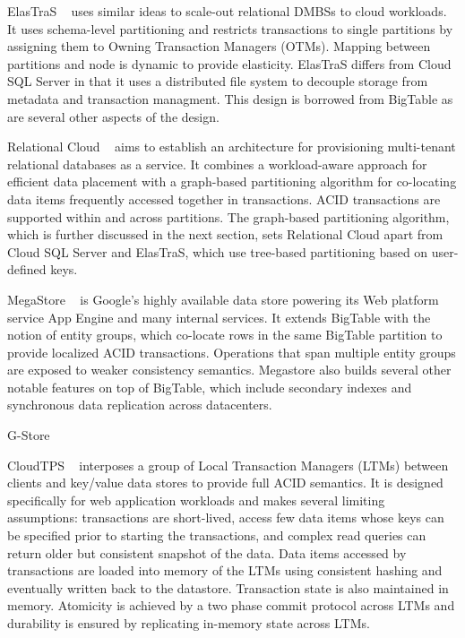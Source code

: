 \documentclass[10pt,final,journal]{IEEEtran}
\begin{document}
ElasTraS ~\cite{Das:2009:EET:1855533.1855540, Das:2010:EAE} uses similar ideas to scale-out relational DMBSs to cloud workloads. It uses schema-level partitioning and restricts transactions to single partitions by assigning them to Owning Transaction Managers (OTMs). Mapping between partitions and node is dynamic to provide elasticity. ElasTraS differs from Cloud SQL Server in that it uses a distributed file system to decouple storage from metadata and transaction managment. This design is borrowed from BigTable as are several other aspects of the design.

Relational Cloud ~\cite{Curino:2011:JPMWMBZ11} aims to establish an architecture for provisioning multi-tenant relational databases as a service. It combines a workload-aware approach for efficient data placement with a graph-based partitioning algorithm for co-locating data items frequently accessed together in transactions. ACID transactions are supported within and across partitions. The graph-based partitioning algorithm, which is further discussed in the next section,  sets Relational Cloud apart from Cloud SQL Server and ElasTraS, which use tree-based partitioning based on user-defined keys.

MegaStore ~\cite{Furman:2008:8530095, Baker:2011:8530095} is Google's highly available data store powering its Web platform service App Engine and many internal services. It extends BigTable with the notion of entity groups, which co-locate rows in the same BigTable partition to provide localized ACID transactions. Operations that span multiple entity groups are exposed to weaker consistency semantics. Megastore also builds several other notable features on top of BigTable, which include secondary indexes and synchronous data replication across datacenters.

G-Store

CloudTPS ~\cite{Zhou:2011:5740834} interposes a group of Local Transaction Managers (LTMs) between clients and key/value data stores to provide full ACID semantics. It is designed specifically for web application workloads and makes several limiting assumptions: transactions are short-lived, access few data items whose keys can be specified prior to starting the transactions, and complex read queries can return older but consistent snapshot of the data. Data items accessed by transactions are loaded into memory of the LTMs using consistent hashing and eventually written back to the datastore. Transaction state is also maintained in memory. Atomicity is achieved by a two phase commit protocol across LTMs and durability is ensured by replicating in-memory state across LTMs.
\end{document}
